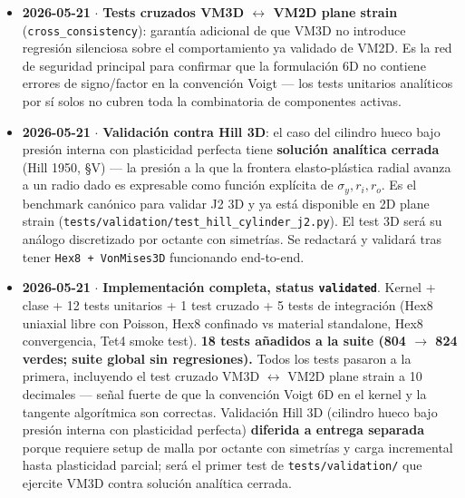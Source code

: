 \documentclass[11pt,letterpaper,oneside]{report}
\begin{document}
\begin{itemize}
  \item \textbf{2026-05-21} \ensuremath{\cdot} \textbf{Tests cruzados VM3D \ensuremath{\leftrightarrow} VM2D plane strain} (\texttt{cross\_consistency}): garantía adicional de que VM3D no introduce regresión silenciosa sobre el comportamiento ya validado de VM2D. Es la red de seguridad principal para confirmar que la formulación 6D no contiene errores de signo/factor en la convención Voigt --- los tests unitarios analíticos por sí solos no cubren toda la combinatoria de componentes activas.
\end{itemize}

\begin{itemize}
  \item \textbf{2026-05-21} \ensuremath{\cdot} \textbf{Validación contra Hill 3D}: el caso del cilindro hueco bajo presión interna con plasticidad perfecta tiene \textbf{solución analítica cerrada} (Hill 1950, §V) --- la presión a la que la frontera elasto-plástica radial avanza a un radio dado es expresable como función explícita de $\sigma_y, r_i, r_o$. Es el benchmark canónico para validar J2 3D y ya está disponible en 2D plane strain (\texttt{tests/validation/test\_hill\_cylinder\_j2.py}). El test 3D será su análogo discretizado por octante con simetrías. Se redactará y validará tras tener \texttt{Hex8 + VonMises3D} funcionando end-to-end.
\end{itemize}

\begin{itemize}
  \item \textbf{2026-05-21} \ensuremath{\cdot} \textbf{Implementación completa, status \texttt{validated}}. Kernel + clase + 12 tests unitarios + 1 test cruzado + 5 tests de integración (Hex8 uniaxial libre con Poisson, Hex8 confinado vs material standalone, Hex8 convergencia, Tet4 smoke test). \textbf{18 tests añadidos a la suite (804 \ensuremath{\to} 824 verdes; suite global sin regresiones).} Todos los tests pasaron a la primera, incluyendo el test cruzado VM3D \ensuremath{\leftrightarrow} VM2D plane strain a 10 decimales --- señal fuerte de que la convención Voigt 6D en el kernel y la tangente algorítmica son correctas. Validación Hill 3D (cilindro hueco bajo presión interna con plasticidad perfecta) \textbf{diferida a entrega separada} porque requiere setup de malla por octante con simetrías y carga incremental hasta plasticidad parcial; será el primer test de \texttt{tests/validation/} que ejercite VM3D contra solución analítica cerrada.
\end{itemize}
\end{document}
